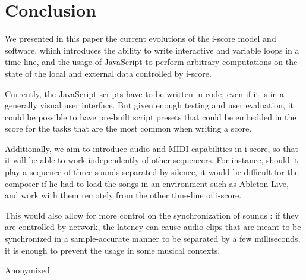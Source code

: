 \documentclass{article}
\begin{document}
\section{Conclusion}
We presented in this paper the current evolutions of the i-score 
model and software, which introduces the ability to write interactive and variable loops in a time-line, 
and the usage of JavaScript to perform arbitrary computations on the state of the local and external data controlled by i-score.

Currently, the JavaScript scripts have to be written in code, even if it 
is in a generally visual user interface. 
But given enough testing and user evaluation, it could be possible to have pre-built script presets 
that could be embedded in the score for the tasks that are the most common when writing a score.

Additionally, we aim to introduce audio and MIDI capabilities in i-score, so that 
it will be able to work independently of other sequencers.
For instance, should it play a sequence of three sounds separated by silence, 
it would be difficult for the composer if he had to load 
the songs in an environment such as Ableton Live, and work with them remotely from the other time-line of i-score.

This would also allow for more control on the synchronization of sounds : if they are controlled by network, 
the latency can cause audio clips that are meant to be synchronized in a sample-accurate manner to be separated by a few milliseconds, it is enough to prevent the usage in some musical contexts.

\begin{acknowledgments}
    Anonymized %
\end{acknowledgments} 


\end{document}
